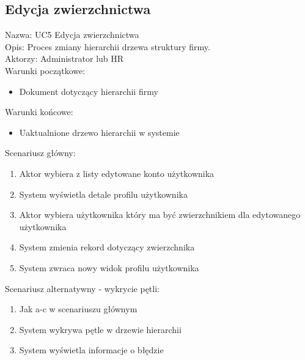 \subsection{Edycja zwierzchnictwa}
\begin{adjustwidth}{5em}{0pt}
Nazwa: UC5 Edycja zwierzchnictwa \\
Opis: Proces zmiany hierarchii drzewa struktury firmy. \\
Aktorzy: Administrator lub HR \\
Warunki początkowe:
\begin{itemize}
\item Dokument dotyczący hierarchii firmy
\end{itemize}
Warunki końcowe:
\begin{itemize}
\item Uaktualnione drzewo hierarchii w systemie 
\end{itemize}
Scenariusz główny:
\begin{enumerate}
\item Aktor wybiera z listy edytowane konto użytkownika
\item System wyświetla detale profilu użytkownika
\item Aktor wybiera użytkownika który ma być zwierzchnikiem dla edytowanego użytkownika
\item System zmienia rekord dotyczący zwierzchnika
\item System zwraca nowy widok profilu użytkownika
\end{enumerate}
Scenariusz alternatywny - wykrycie pętli: 
\begin{enumerate}
\item Jak a-c w scenariuszu głównym
\item System wykrywa pętle w drzewie hierarchii
\item System wyświetla informacje o błędzie
\end{enumerate}
\end{adjustwidth}

